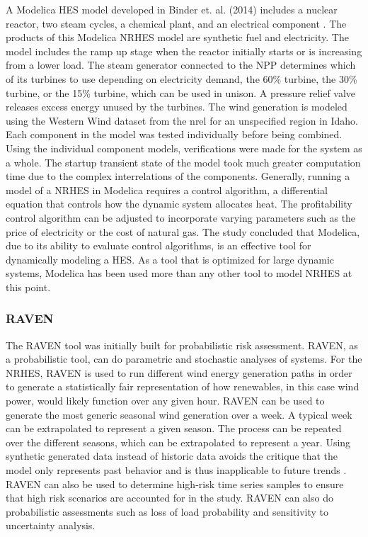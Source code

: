 \documentclass[12pt]{UIdahoMastersThesis}
\begin{document}
A Modelica HES model developed in Binder et. al. (2014) includes a nuclear reactor, two steam cycles, a chemical plant, and an electrical component \cite{Binder2014}. The products of this Modelica NRHES model are synthetic fuel and electricity. The model includes the ramp up stage when the reactor initially starts or is increasing from a lower load. The steam generator connected to the NPP determines which of its turbines to use depending on electricity demand, the 60\% turbine, the 30\% turbine, or the 15\% turbine, which can be used in unison. A pressure relief valve releases excess energy unused by the turbines. The wind generation is modeled using the Western Wind dataset from the \ac{nrel} for an unspecified region in Idaho. Each component in the model was tested individually before being combined. Using the individual component models, verifications were made for the system as a whole. The startup transient state of the model took much greater computation time due to the complex interrelations of the components. Generally, running a model of a NRHES in Modelica requires a control algorithm, a differential equation that controls how the dynamic system allocates heat. The profitability control algorithm can be adjusted to incorporate varying parameters such as the price of electricity or the cost of natural gas. The study concluded that Modelica, due to its ability to evaluate control algorithms, is an effective tool for dynamically modeling a HES. As a tool that is optimized for large dynamic systems, Modelica has been used more than any other tool to model NRHES at this point.

\subsubsection{RAVEN}
The RAVEN tool was initially built for probabilistic risk assessment. RAVEN, as a probabilistic tool, can do parametric and stochastic analyses of systems\cite{RabitiRAVEN}. For the NRHES, RAVEN is used to run different wind energy generation paths in order to generate a statistically fair representation of how renewables, in this case wind power, would likely function over any given hour. RAVEN can be used to generate the most generic seasonal wind generation over a week. A typical week can be extrapolated to represent a given season. The process can be repeated over the different seasons, which can be extrapolated to represent a year. Using synthetic generated data instead of historic data avoids the critique that the model only represents past behavior and is thus inapplicable to future trends \cite{redfoot_epiney_2016}. RAVEN can also be used to determine high-risk time series samples to ensure that high risk scenarios are accounted for in the study. RAVEN can also do probabilistic assessments such as loss of load probability and sensitivity to uncertainty analysis.
\end{document}
